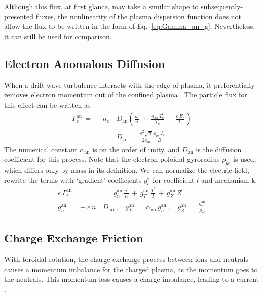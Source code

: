 Although this flux, at first glance, may take a similar shape to subsequently-presented fluxes, the nonlinearity of the plasma dispersion function does not allow the flux to be written in the form of Eq.~\ref{eq:Gamma_an_g}.
Nevertheless, it can still be used for comparison.


\subsection{Electron Anomalous Diffusion}\label{ssec:an_diffusion}
When a drift wave turbulence interacts with the edge of plasma, it preferentially removes electron momentum out of the confined plasma \cite{itoh_model_1988} \cite{stringer_non-ambipolar_1995}.
The particle flux for this effect can be written as
\begin{align} %
	\Gamma_e^\text{an} \,=\, -n_e \, &D_\text{an} \left(\frac{n^\prime}{n} \,+\,
		\frac{\alpha_\text{an}\,T_e^\prime}{T_e} \,+\, \frac{e\,E_r}{T_e}\right)
		\label{eq:Gamma_an_orig} \\
	&D_\text{an} \,=\, \frac{\epsilon^2 \sqrt{\pi}}{2 a_m}
		\frac{\rho_{\theta e} \, T_e}{B} \label{eq:D_an}
\end{align}
The numerical constant $\alpha_\text{an}$ is on the order of unity, and $D_\text{an}$ is the diffusion coefficient for this process.
Note that the electron poloidal gyroradius $\rho_{\theta e}$ is used, which differs only by mass in its definition.
We can normalize the electric field, rewrite the terms with `gradient' coefficients $g_l^\text{k}$ for coefficient $l$ and mechanism $\text{k}$.
\begin{align} %
	e\,\Gamma_e^\text{an} \,&=\, g_n^\text{an}\,\frac{n^\prime}{n} \,+\,
		g_T^\text{an}\,\frac{T^\prime}{T} \,+\,
		g_Z^\text{an}\,Z \label{eq:Gamma_an_g} \\
	g_n^\text{an} \,=\, -e \, n \, &D_\text{an}~,~~~~
		g_T^\text{an} \,=\, \alpha_\text{an} \, g_n^\text{an}~,~~~~
		g_Z^\text{an} \,=\, \frac{g_n^\text{an}}{\rho_{\theta i}}
		\label{eq:g_an}
\end{align}


\subsection{Charge Exchange Friction}\label{ssec:cx_friction}
With toroidal rotation, the charge exchange process between ions and neutrals causes a momentum imbalance for the charged plasma, as the momentum goes to the neutrals.
This momentum loss causes a charge imbalance, leading to a current \cite{toda_theoretical_1997}.

